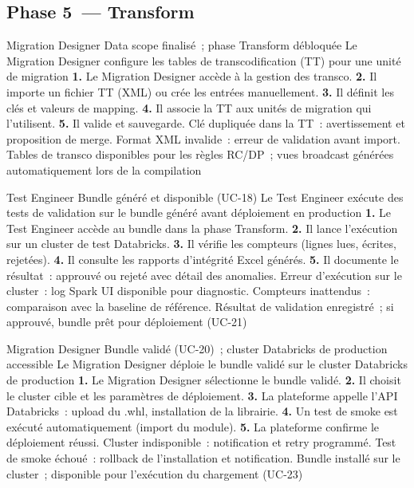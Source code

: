 \subsection*{Phase 5~--- Transform}

  {Migration Designer}
  {Data scope finalisé~; phase Transform débloquée}
  {Le Migration Designer configure les tables de transcodification (TT) pour une unité de migration}
  {\textbf{1.} Le Migration Designer accède à la gestion des transco. \textbf{2.} Il importe un fichier TT (XML) ou crée les entrées manuellement. \textbf{3.} Il définit les clés et valeurs de mapping. \textbf{4.} Il associe la TT aux unités de migration qui l'utilisent. \textbf{5.} Il valide et sauvegarde.}
  {Clé dupliquée dans la TT~: avertissement et proposition de merge. Format XML invalide~: erreur de validation avant import.}
  {Tables de transco disponibles pour les règles RC/DP~; vues broadcast générées automatiquement lors de la compilation}

  {Test Engineer}
  {Bundle généré et disponible (UC-18)}
  {Le Test Engineer exécute des tests de validation sur le bundle généré avant déploiement en production}
  {\textbf{1.} Le Test Engineer accède au bundle dans la phase Transform. \textbf{2.} Il lance l'exécution sur un cluster de test Databricks. \textbf{3.} Il vérifie les compteurs (lignes lues, écrites, rejetées). \textbf{4.} Il consulte les rapports d'intégrité Excel générés. \textbf{5.} Il documente le résultat~: approuvé ou rejeté avec détail des anomalies.}
  {Erreur d'exécution sur le cluster~: log Spark UI disponible pour diagnostic. Compteurs inattendus~: comparaison avec la baseline de référence.}
  {Résultat de validation enregistré~; si approuvé, bundle prêt pour déploiement (UC-21)}

  {Migration Designer}
  {Bundle validé (UC-20)~; cluster Databricks de production accessible}
  {Le Migration Designer déploie le bundle validé sur le cluster Databricks de production}
  {\textbf{1.} Le Migration Designer sélectionne le bundle validé. \textbf{2.} Il choisit le cluster cible et les paramètres de déploiement. \textbf{3.} La plateforme appelle l'API Databricks~: upload du .whl, installation de la librairie. \textbf{4.} Un test de smoke est exécuté automatiquement (import du module). \textbf{5.} La plateforme confirme le déploiement réussi.}
  {Cluster indisponible~: notification et retry programmé. Test de smoke échoué~: rollback de l'installation et notification.}
  {Bundle installé sur le cluster~; disponible pour l'exécution du chargement (UC-23)}

